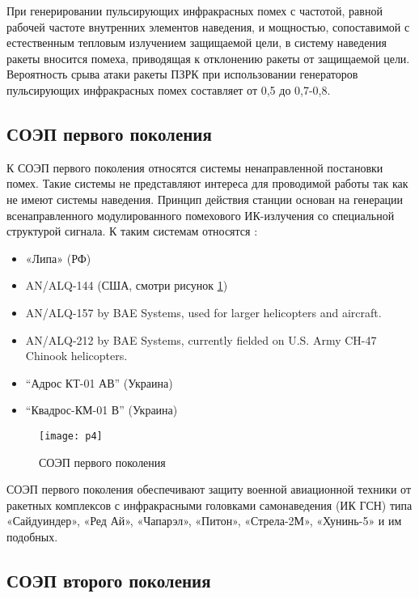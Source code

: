 При генерировании пульсирующих инфракрасных помех с частотой, равной рабочей частоте внутренних элементов наведения, и мощностью, сопоставимой с естественным тепловым излучением защищаемой цели, в систему наведения ракеты вносится помеха, приводящая к отклонению ракеты от защищаемой цели. Вероятность срыва атаки ракеты ПЗРК при использовании генераторов пульсирующих инфракрасных помех составляет от 0,5 до 0,7-0,8.

\subsection{СОЭП первого поколения}	

К СОЭП первого поколения относятся системы ненаправленной постановки помех. Такие системы не представляют интереса для проводимой работы так как не имеют системы наведения. Принцип действия станции основан на генерации всенаправленного модулированного помехового ИК-излучения со специальной структурой сигнала. К таким системам относятся \cite[]{SOEP_LIPA}:

\begin{itemize}
	\item «Липа» (РФ)	
	\item AN/ALQ-144 (США, смотри рисунок \ref{fig:alq})	
	\item AN/ALQ-157 by BAE Systems, used for larger helicopters and aircraft.
	\item AN/ALQ-212 by BAE Systems, currently fielded on U.S. Army CH-47 Chinook helicopters.
	\item “Адрос КТ-01 АВ” (Украина)
	\item “Квадрос-КМ-01 В” (Украина) 		
\end{itemize}

\begin{figure}[ht]
	\texttt{[image: p4]} 
	\caption{СОЭП первого поколения}
	\label{fig:alq}
\end{figure}

СОЭП первого поколения обеспечивают защиту военной авиационной техники от ракетных комплексов с инфракрасными головками самонаведения (ИК ГСН) типа «Сайдуиндер», «Ред Ай», «Чапарэл», «Питон», «Стрела-2М», «Хунинь-5» и им подобных. 

\subsection{СОЭП второго поколения}	

